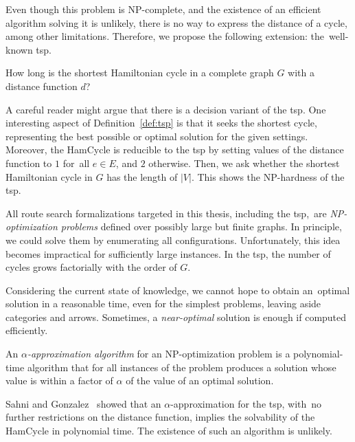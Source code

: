 Even though this problem is NP-complete, and the existence of an efficient algorithm solving it is unlikely, there is no way to express the distance of a cycle, among other limitations. Therefore, we propose the following extension: the~well-known \ac{tsp}.

\begin{definition}\label{def:tsp}
How long is the shortest Hamiltonian cycle in a complete graph $G$ with a distance function $d$?
\end{definition}

A careful reader might argue that there is a decision variant of the \acs{tsp}. One interesting aspect of Definition~\ref{def:tsp} is that it seeks the shortest cycle, representing the best possible or optimal solution for the given settings. Moreover, the HamCycle is reducible to the \acs{tsp} by setting values of the distance function to $1$ for~all $e \in E$, and $2$ otherwise. Then, we ask whether the shortest Hamiltonian cycle in $G$ has the length of $\left| V \right|$. This shows the NP-hardness of the \acs{tsp}.

All route search formalizations targeted in this thesis, including the \acs{tsp},~are \emph{NP-optimization problems} defined over possibly large but finite graphs. In principle, we could solve them by enumerating all configurations. Unfortunately, this idea becomes impractical for sufficiently large instances. In the \acs{tsp}, the number of cycles grows factorially with the order of $G$.

Considering the current state of knowledge, we cannot hope to obtain an~optimal solution in a reasonable time, even for the simplest problems, leaving aside categories and arrows. Sometimes, a \emph{near-optimal} solution is enough if computed efficiently.

\begin{definition}
An \emph{$\alpha$-approximation algorithm} for an NP-optimization problem is a polynomial-time algorithm that for all instances of the problem produces a solution whose value is within a factor of $\alpha$ of the value of an optimal solution.
\end{definition}

Sahni and Gonzalez~\cite{sahni76} showed that an $\alpha$-approximation for the \acs{tsp}, with~no further restrictions on the distance function, implies the solvability of the HamCycle in polynomial time. The existence of such an algorithm is unlikely.

